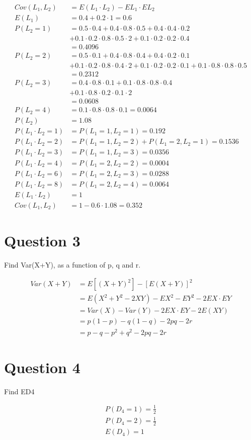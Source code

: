 \documentclass[11pt]{article}
\begin{document}
\begin{align*}
Cov(L_1, L_2) &= E(L_1 \cdot L_2) - EL_1 \cdot EL_2\\
E(L_1) &= 0.4 + 0.2 \cdot 1 = 0.6\\
P(L_2 = 1) &= 0.5 \cdot 0.4 + 0.4 \cdot 0.8 \cdot 0.5 + 0.4 \cdot 0.4 \cdot 0.2\\
		&+ 0.1 \cdot 0.2 \cdot 0.8 \cdot 0.5 \cdot 2 + 0.1 \cdot 0.2 \cdot 0.2 \cdot 0.4\\
	&= 0.4096\\ 
P(L_2 = 2) &= 0.5 \cdot 0.1 + 0.4 \cdot 0.8 \cdot 0.4 + 0.4 \cdot 0.2 \cdot 0.1\\
	& + 0.1 \cdot 0.2 \cdot 0.8 \cdot 0.4 \cdot 2 + 0.1 \cdot 0.2 \cdot 0.2 \cdot 0.1 + 0.1 \cdot 0.8 \cdot 0.8 \cdot 0.5\\
	&= 0.2312\\
P(L_2 = 3) &= 0.4 \cdot 0.8 \cdot 0.1 + 0.1 \cdot 0.8 \cdot 0.8 \cdot 0.4\\
	&+ 0.1 \cdot 0.8 \cdot 0.2 \cdot 0.1 \cdot 2\\
	&= 0.0608\\
P(L_2 = 4) &= 0.1 \cdot 0.8 \cdot 0.8 \cdot 0.1 = 0.0064\\
P(L_2) &= 1.08\\
P(L_1 \cdot L_2 = 1) &= P(L_1 = 1, L_2 = 1) = 0.192\\
P(L_1 \cdot L_2 = 2) &= P(L_1 = 1, L_2 = 2) +  P(L_1 = 2, L_2 = 1) = 0.1536\\
P(L_1 \cdot L_2 = 3) &= P(L_1 = 1, L_2 = 3) = 0.0356\\
P(L_1 \cdot L_2 = 4) &= P(L_1 = 2, L_2 = 2) = 0.0004\\
P(L_1 \cdot L_2 = 6) &= P(L_1 = 2, L_2 = 3) = 0.0288\\
P(L_1 \cdot L_2 = 8) &= P(L_1 = 2, L_2 = 4) = 0.0064\\
E(L_1 \cdot L_2) &= 1\\
Cov(L_1, L_2) &= 1- 0.6 \cdot 1.08 = 0.352
\end{align*}

\section{Question 3}

Find Var(X+Y), as a function of p, q and r.

\begin{align*}
Var(X+Y) &= E[(X+Y)^2] - [E(X+Y)]^2\\
		&= E(X^2 + Y^2 - 2XY) - EX^2 - EY^2 - 2EX \cdot EY\\
		&= Var(X) - Var(Y) - 2EX \cdot EY - 2E(XY)\\
		&=p(1-p) - q(1-q) - 2pq - 2r\\
		&=p - q - p^2 + q^2 - 2pq - 2r
\end{align*}

\section{Question 4}

Find ED4

\begin{align*}
P(D_4 = 1) = \frac12\\
P(D_4 = 2) = \frac12\\
E(D_4) = 1\\
\end{align*}
\end{document}
